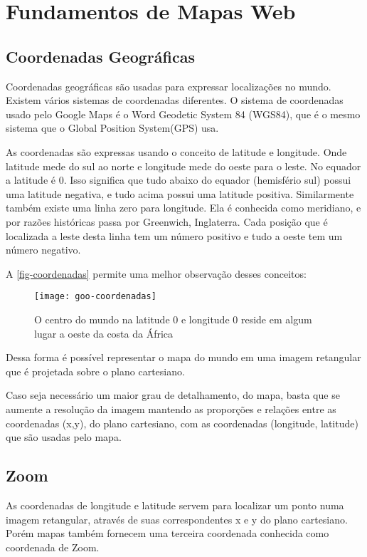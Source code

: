 \section{Fundamentos de Mapas Web}
	
	\subsection{Coordenadas Geográficas}
	Coordenadas geográficas são usadas para expressar localizações no mundo. Existem vários sistemas de coordenadas diferentes. O sistema de coordenadas usado pelo Google Maps é o Word Geodetic System 84 (WGS84), que é o mesmo sistema que o Global Position System(GPS) usa.
	
	As coordenadas são expressas usando o conceito de latitude e longitude. Onde latitude mede do sul ao norte e longitude mede do oeste para o leste. No equador a latitude é 0. Isso significa que tudo abaixo do equador (hemisfério sul) possui uma latitude negativa, e tudo acima possui uma latitude positiva. Similarmente também existe uma linha zero para longitude. Ela é conhecida como meridiano, e por razões históricas passa por Greenwich, Inglaterra. Cada posição que é localizada a leste desta linha tem um número positivo e tudo a oeste tem um número negativo\cite[4]{livroGoogleApiV3}. 
	
	A \autoref{fig-coordenadas} permite uma melhor observação desses conceitos:
	\begin{figure}[htb]
	\caption{\label{fig-coordenadas} O centro do mundo na latitude 0 e longitude 0 reside em algum lugar a oeste da costa da África}
	\begin{center}
	    \texttt{[image: goo-coordenadas]}
	\end{center}
	\end{figure}
	
	Dessa forma é possível representar o mapa do mundo em uma imagem retangular que é projetada sobre o plano cartesiano.
	
	Caso seja necessário um maior grau de detalhamento, do mapa, basta que se aumente a resolução da imagem mantendo as proporções e relações entre as coordenadas (x,y), do plano cartesiano, com as coordenadas (longitude, latitude) que são usadas pelo mapa.
		
	\subsection{Zoom}
	As coordenadas de longitude e latitude servem para localizar um ponto numa imagem retangular, através de suas correspondentes x e y do plano cartesiano. Porém mapas também fornecem uma terceira coordenada conhecida como coordenada de Zoom.
	
